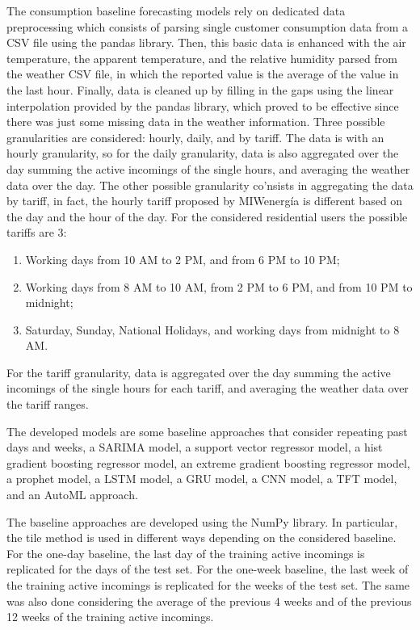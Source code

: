 The consumption baseline forecasting models rely on dedicated data preprocessing which consists of parsing single customer consumption data from a CSV file using the pandas library.
Then, this basic data is enhanced with the air temperature, the apparent temperature, and the relative humidity parsed from the weather CSV file, in which the reported value is the average of the value in the last hour.
Finally, data is cleaned up by filling in the gaps using the linear interpolation provided by the pandas library, which proved to be effective since there was just some missing data in the weather information.
Three possible granularities are considered: hourly, daily, and by tariff.
The data is with an hourly granularity, so for the daily granularity, data is also aggregated over the day summing the active incomings of the single hours, and averaging the weather data over the day.
The other possible granularity co'nsists in aggregating the data by tariff, in fact, the hourly tariff proposed by MIWenergía is different based on the day and the hour of the day.
For the considered residential users the possible tariffs are 3:
\begin{enumerate}
  \item Working days from 10 AM to 2 PM, and from 6 PM to 10 PM;
  \item Working days from 8 AM to 10 AM, from 2 PM to 6 PM, and from 10 PM to midnight;
  \item Saturday, Sunday, National Holidays, and working days from midnight to 8 AM.
\end{enumerate}
For the tariff granularity, data is aggregated over the day summing the active incomings of the single hours for each tariff, and averaging the weather data over the tariff ranges.

The developed models are some baseline approaches that consider repeating past days and weeks, a SARIMA model, a support vector regressor model, a hist gradient boosting regressor model, an extreme gradient boosting regressor model, a prophet model, a LSTM model, a GRU model, a CNN model, a TFT model, and an AutoML approach.

The baseline approaches are developed using the NumPy library.
In particular, the tile method is used in different ways depending on the considered baseline.
For the one-day baseline, the last day of the training active incomings is replicated for the days of the test set.
For the one-week baseline, the last week of the training active incomings is replicated for the weeks of the test set.
The same was also done considering the average of the previous 4 weeks and of the previous 12 weeks of the training active incomings.

